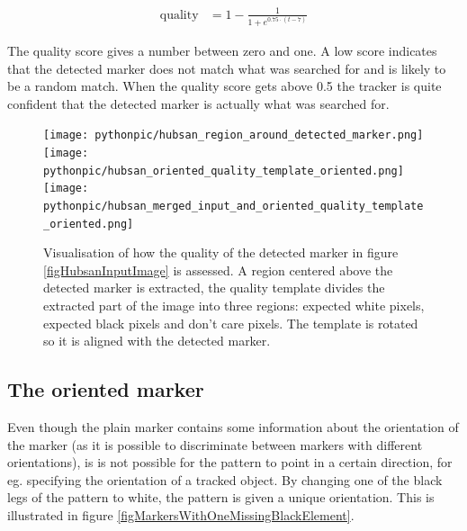 \documentclass{article}
\begin{document}
\begin{align} 
\text{quality} &= 1 - \frac{1}{1 + e^{0.75 \cdot (t - 7)}} 
\end{align} 
 
The quality score gives a number between zero and one. 
A low score indicates that the detected marker does not match what was searched for and is likely to be a random match. 
When the quality score gets above 0.5 the tracker is quite confident that the detected marker is actually what was searched for. 
 
\begin{figure} 
\texttt{[image: pythonpic/hubsan\_region\_around\_detected\_marker.png]} 
\hfill 
\texttt{[image: pythonpic/hubsan\_oriented\_quality\_template\_oriented.png]} 
\hfill 
\texttt{[image: pythonpic/hubsan\_merged\_input\_and\_oriented\_quality\_template\_oriented.png]} 
\caption{Visualisation of how the quality of the detected marker in figure \ref{figHubsanInputImage} is assessed. 
A region centered above the detected marker is extracted, the quality template divides the extracted part 
of the image into three regions: expected white pixels, expected black pixels and don't care pixels. 
The template is rotated so it is aligned with the detected marker.} 
\label{figQualityEstimationProcess} 
\end{figure} 
 
\subsection{The oriented marker} 
Even though the plain marker contains some information about the orientation of the 
marker (as it is possible to discriminate between markers with different orientations), 
is is not possible for the pattern to point in a certain direction, for eg. specifying the orientation of a tracked object. 
By changing one of the black legs of the pattern to white, the pattern is given 
a unique orientation. 
This is illustrated in figure \ref{figMarkersWithOneMissingBlackElement}. 
 
\end{document}
